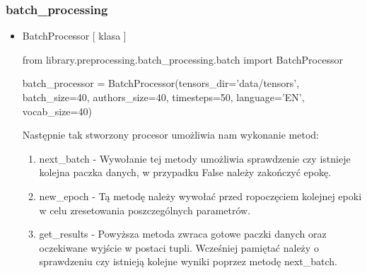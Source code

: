 \newpage
\subsubsection{batch\_processing}

\myspace
{}
\myspace

\begin{itemize}

\item {BatchProcessor [ klasa ] }
\begin{import}
from library.preprocessing.batch_processing.batch import BatchProcessor

batch_processor = BatchProcessor(tensors_dir='data/tensors',
                                             batch_size=40,
                                             authors_size=40,
                                             timesteps=50,
                                             language='EN',
                                             vocab_size=40)
\end{import}

Następnie tak stworzony procesor umożliwia nam wykonanie metod:

\begin{enumerate}
	\item {next\_batch } - 
	Wywołanie tej metody umożliwia sprawdzenie czy istnieje kolejna paczka danych, w przypadku False
	należy zakończyć epokę.
	
	\item {new\_epoch } - 
	Tą metodę należy wywołać przed ropoczęciem kolejnej epoki w celu zresetowania poszczególnych 
	parametrów.
	
	\item { get\_results } - 
	Powyższa metoda zwraca gotowe paczki danych oraz oczekiwane wyjście w postaci tupli. 
	Wcześniej pamiętać należy o sprawdzeniu czy istnieją kolejne wyniki poprzez metodę next\_batch.
\end{enumerate}

\end{itemize}